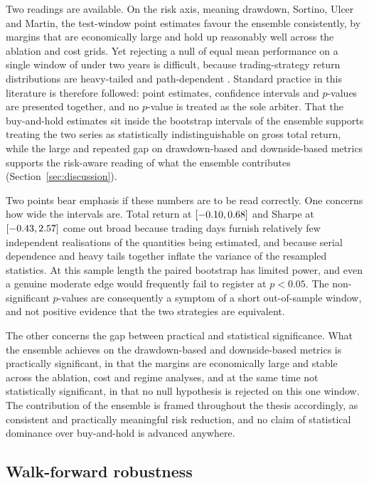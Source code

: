 Two readings are available. On the risk axis, meaning drawdown, Sortino, Ulcer and Martin, the test-window point estimates favour the ensemble consistently, by margins that are economically large and hold up reasonably well across the ablation and cost grids. Yet rejecting a null of equal mean performance on a single window of under two years is difficult, because trading-strategy return distributions are heavy-tailed and path-dependent \cite{politis1994,bailey2014}. Standard practice in this literature is therefore followed: point estimates, confidence intervals and $p$-values are presented together, and no $p$-value is treated as the sole arbiter. That the buy-and-hold estimates sit inside the bootstrap intervals of the ensemble supports treating the two series as statistically indistinguishable on gross total return, while the large and repeated gap on drawdown-based and downside-based metrics supports the risk-aware reading of what the ensemble contributes (Section~\ref{sec:discussion}).

Two points bear emphasis if these numbers are to be read correctly. One concerns how wide the intervals are. Total return at $[-0.10, 0.68]$ and Sharpe at $[-0.43, 2.57]$ come out broad because \OOSDays{} trading days furnish relatively few independent realisations of the quantities being estimated, and because serial dependence and heavy tails together inflate the variance of the resampled statistics. At this sample length the paired bootstrap has limited power, and even a genuine moderate edge would frequently fail to register at $p < 0.05$. The non-significant $p$-values are consequently a symptom of a short out-of-sample window, and not positive evidence that the two strategies are equivalent.

The other concerns the gap between practical and statistical significance. What the ensemble achieves on the drawdown-based and downside-based metrics is practically significant, in that the margins are economically large and stable across the ablation, cost and regime analyses, and at the same time not statistically significant, in that no null hypothesis is rejected on this one window. The contribution of the ensemble is framed throughout the thesis accordingly, as consistent and practically meaningful risk reduction, and no claim of statistical dominance over buy-and-hold is advanced anywhere.

\subsection{Walk-forward robustness}\label{subsec:kfold}

